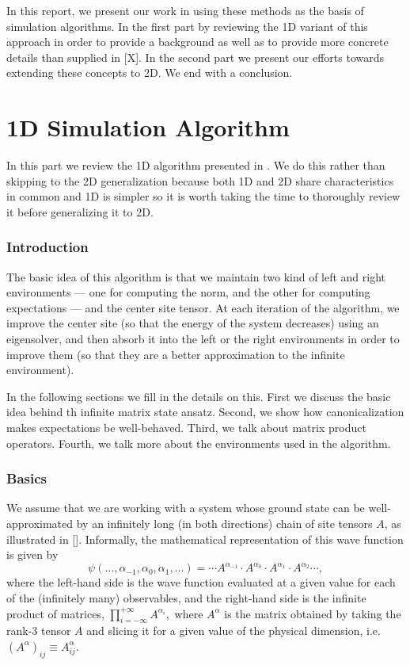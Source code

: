 \documentclass{article}
\begin{document}
In this report, we present our work in using these methods as the basis of simulation algorithms.  In the first part by reviewing the 1D variant of this approach in order to provide a background as well as to provide more concrete details than supplied in [X].  In the second part we present our efforts towards extending these concepts to 2D.  We end with a conclusion.

\part{1D Simulation Algorithm}
\label{1dsim}

In this part we review the 1D algorithm presented in \cite{Crosswhite2008}.  We do this rather than skipping to the 2D generalization because both 1D and 2D share characteristics in common and 1D is simpler so it is worth taking the time to thoroughly review it before generalizing it to 2D.

\section{Introduction}

The basic idea of this algorithm is that we maintain two kind of left and right environments --- one for computing the norm, and the other for computing expectations --- and the center site tensor.  At each iteration of the algorithm, we improve the center site (so that the energy of the system decreases) using an eigensolver, and then absorb it into the left or the right environments in order to improve them (so that they are a better approximation to the infinite environment).

In the following sections we fill in the details on this.  First we discuss the basic idea behind th infinite matrix state ansatz.  Second, we show how canonicalization makes expectations be well-behaved.  Third, we talk about matrix product operators.  Fourth, we talk more about the environments used in the algorithm.

\section{Basics}

We assume that we are working with a system whose ground state can be well-approximated by an infinitely long (in both directions) chain of site tensors $A$, as illustrated in [].  Informally, the mathematical representation of this wave function is given by
\begin{equation}
\label{bi-inf-1d-state-a}
\psi(\dots,\alpha_{-1},\alpha_{0},\alpha_1,\dots)= \cdots A^{\alpha_{-1}} \cdot A^{\alpha_0}\cdot A^{\alpha_1}\cdot A^{\alpha_2} \cdots,
\end{equation}
where the left-hand side is the wave function evaluated at a given value for each of the (infinitely many) observables, and the right-hand side is the infinite product of matrices, $\prod_{i=-\infty}^{+\infty} A^{\alpha_i},$ where $A^{\alpha}$ is the matrix obtained by taking the rank-3 tensor $A$ and slicing it for a given value of the physical dimension, i.e. $(A^\alpha)_{ij}\equiv A^\alpha_{ij}$.
\end{document}
